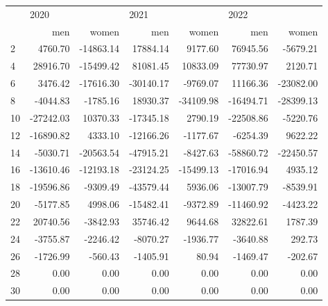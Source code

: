 \begin{tabular}{lrrrrrr}
\toprule
{} & \multicolumn{2}{l}{2020} & \multicolumn{2}{l}{2021} & \multicolumn{2}{l}{2022} \\
{} &       men &     women &       men &     women &       men &     women \\
\midrule
2  &   4760.70 & -14863.14 &  17884.14 &   9177.60 &  76945.56 &  -5679.21 \\
4  &  28916.70 & -15499.42 &  81081.45 &  10833.09 &  77730.97 &   2120.71 \\
6  &   3476.42 & -17616.30 & -30140.17 &  -9769.07 &  11166.36 & -23082.00 \\
8  &  -4044.83 &  -1785.16 &  18930.37 & -34109.98 & -16494.71 & -28399.13 \\
10 & -27242.03 &  10370.33 & -17345.18 &   2790.19 & -22508.86 &  -5220.76 \\
12 & -16890.82 &   4333.10 & -12166.26 &  -1177.67 &  -6254.39 &   9622.22 \\
14 &  -5030.71 & -20563.54 & -47915.21 &  -8427.63 & -58860.72 & -22450.57 \\
16 & -13610.46 & -12193.18 & -23124.25 & -15499.13 & -17016.94 &   4935.12 \\
18 & -19596.86 &  -9309.49 & -43579.44 &   5936.06 & -13007.79 &  -8539.91 \\
20 &  -5177.85 &   4998.06 & -15482.41 &  -9372.89 & -11460.92 &  -4423.22 \\
22 &  20740.56 &  -3842.93 &  35746.42 &   9644.68 &  32822.61 &   1787.39 \\
24 &  -3755.87 &  -2246.42 &  -8070.27 &  -1936.77 &  -3640.88 &    292.73 \\
26 &  -1726.99 &   -560.43 &  -1405.91 &     80.94 &  -1469.47 &   -202.67 \\
28 &      0.00 &      0.00 &      0.00 &      0.00 &      0.00 &      0.00 \\
30 &      0.00 &      0.00 &      0.00 &      0.00 &      0.00 &      0.00 \\
\bottomrule
\end{tabular}
